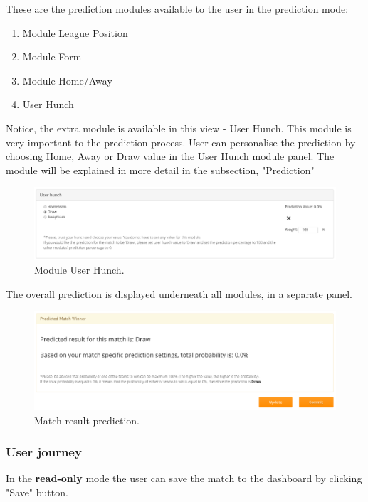 These are the prediction modules available to the user in the prediction mode:

\begin{enumerate}
	\item Module League Position
	\item Module Form
	\item Module Home/Away
	\item User Hunch
\end{enumerate}

Notice, the extra module is available in this view - User Hunch. This module is very important to the prediction process. User can personalise the prediction by choosing Home, Away or Draw value in the User Hunch module panel. The module will be explained in more detail in the subsection, "Prediction" \cite{subsec:predictionimplementation}

\begin{figure}[H]
	\begin{center}
		\includegraphics[width=.90\textwidth]{impl/images/userHunch}
		\caption{Module User Hunch.} \label{fig:using:userHunch}
	\end{center}
\end{figure}

The overall prediction is displayed underneath all modules, in a separate panel.

\begin{figure}[H]
	\begin{center}
		\includegraphics[width=.90\textwidth]{impl/images/prediction}
		\caption{Match result prediction.} \label{fig:using:prediction}
	\end{center}
\end{figure}

\subsubsection*{User journey}
\label{subsec:upcomingmatchviewuserjourney}
In the \textbf{read-only} mode the user can save the match to the dashboard by clicking "Save" button. 

